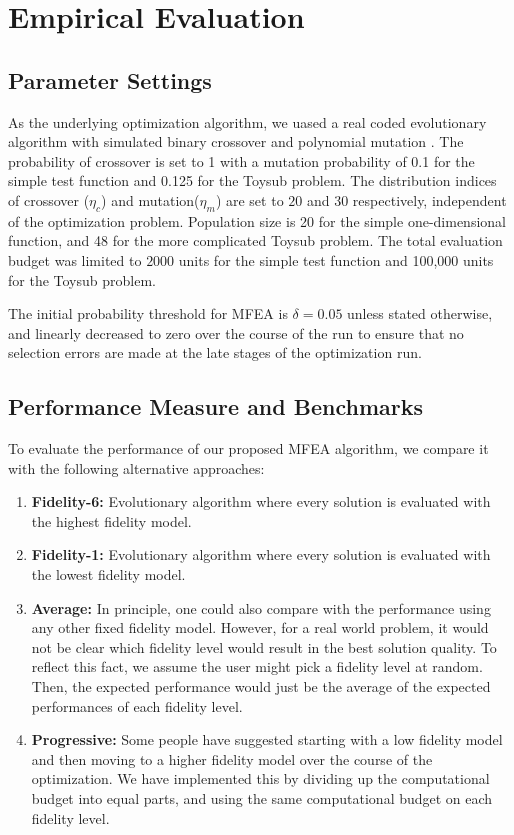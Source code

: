 \section{Empirical Evaluation\label{sec:results}}
\subsection{Parameter Settings}

As the underlying optimization algorithm, we uased a real coded evolutionary algorithm with simulated binary crossover and polynomial mutation \cite{Deb01}. The probability of crossover is set to 1 with a mutation probability of 0.1 for the simple test function and 0.125 for the Toysub problem. The distribution indices of crossover ($\eta_c$) and mutation($\eta_m$) are set to $20$ and $30$ respectively, independent of the optimization problem. 
Population size is 20 for the simple one-dimensional function, and 48 for the more complicated Toysub problem.
The total evaluation budget was limited to $2000$ units for the simple test function and 100,000 units for the Toysub problem. 

The initial probability threshold for MFEA is $\delta=0.05$ unless stated otherwise, and linearly decreased to zero over the course of the run to ensure that no selection errors are made at the late stages of the optimization run.


\subsection{Performance Measure and Benchmarks}

To evaluate the performance of our proposed MFEA algorithm, we compare it with the following alternative approaches:
\begin{enumerate}
	\item {\bf Fidelity-6:} Evolutionary algorithm where every solution is evaluated with the highest fidelity model. 
	\item {\bf Fidelity-1:} Evolutionary algorithm where every solution is evaluated with the lowest fidelity model.
	\item {\bf Average:} In principle, one could also compare with the performance using any other fixed fidelity model. However, for a real world problem, it would not be clear which fidelity level would result in the best solution quality. To reflect this fact, we assume the user might pick a fidelity level at random. Then, the expected performance would just be the average of the expected performances of each fidelity level.
	\item {\bf Progressive:} Some people have suggested starting with a low fidelity model and then moving to a higher fidelity model over the course of the optimization. We have implemented this by dividing up the computational budget into equal parts, and using the same computational budget on each fidelity level.
\end{enumerate}

